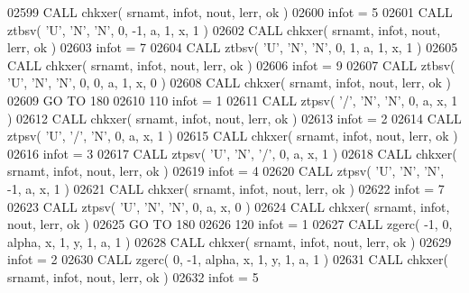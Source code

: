 \begin{DoxyCode}
02599       \textcolor{keyword}{CALL }chkxer( srnamt, infot, nout, lerr, ok )
02600       infot = 5
02601       \textcolor{keyword}{CALL }ztbsv( \textcolor{stringliteral}{'U'}, \textcolor{stringliteral}{'N'}, \textcolor{stringliteral}{'N'}, 0, -1, a, 1, x, 1 )
02602       \textcolor{keyword}{CALL }chkxer( srnamt, infot, nout, lerr, ok )
02603       infot = 7
02604       \textcolor{keyword}{CALL }ztbsv( \textcolor{stringliteral}{'U'}, \textcolor{stringliteral}{'N'}, \textcolor{stringliteral}{'N'}, 0, 1, a, 1, x, 1 )
02605       \textcolor{keyword}{CALL }chkxer( srnamt, infot, nout, lerr, ok )
02606       infot = 9
02607       \textcolor{keyword}{CALL }ztbsv( \textcolor{stringliteral}{'U'}, \textcolor{stringliteral}{'N'}, \textcolor{stringliteral}{'N'}, 0, 0, a, 1, x, 0 )
02608       \textcolor{keyword}{CALL }chkxer( srnamt, infot, nout, lerr, ok )
02609       \textcolor{keywordflow}{GO TO} 180
02610   110 infot = 1
02611       \textcolor{keyword}{CALL }ztpsv( \textcolor{stringliteral}{'/'}, \textcolor{stringliteral}{'N'}, \textcolor{stringliteral}{'N'}, 0, a, x, 1 )
02612       \textcolor{keyword}{CALL }chkxer( srnamt, infot, nout, lerr, ok )
02613       infot = 2
02614       \textcolor{keyword}{CALL }ztpsv( \textcolor{stringliteral}{'U'}, \textcolor{stringliteral}{'/'}, \textcolor{stringliteral}{'N'}, 0, a, x, 1 )
02615       \textcolor{keyword}{CALL }chkxer( srnamt, infot, nout, lerr, ok )
02616       infot = 3
02617       \textcolor{keyword}{CALL }ztpsv( \textcolor{stringliteral}{'U'}, \textcolor{stringliteral}{'N'}, \textcolor{stringliteral}{'/'}, 0, a, x, 1 )
02618       \textcolor{keyword}{CALL }chkxer( srnamt, infot, nout, lerr, ok )
02619       infot = 4
02620       \textcolor{keyword}{CALL }ztpsv( \textcolor{stringliteral}{'U'}, \textcolor{stringliteral}{'N'}, \textcolor{stringliteral}{'N'}, -1, a, x, 1 )
02621       \textcolor{keyword}{CALL }chkxer( srnamt, infot, nout, lerr, ok )
02622       infot = 7
02623       \textcolor{keyword}{CALL }ztpsv( \textcolor{stringliteral}{'U'}, \textcolor{stringliteral}{'N'}, \textcolor{stringliteral}{'N'}, 0, a, x, 0 )
02624       \textcolor{keyword}{CALL }chkxer( srnamt, infot, nout, lerr, ok )
02625       \textcolor{keywordflow}{GO TO} 180
02626   120 infot = 1
02627       \textcolor{keyword}{CALL }zgerc( -1, 0, alpha, x, 1, y, 1, a, 1 )
02628       \textcolor{keyword}{CALL }chkxer( srnamt, infot, nout, lerr, ok )
02629       infot = 2
02630       \textcolor{keyword}{CALL }zgerc( 0, -1, alpha, x, 1, y, 1, a, 1 )
02631       \textcolor{keyword}{CALL }chkxer( srnamt, infot, nout, lerr, ok )
02632       infot = 5

\end{DoxyCode}
